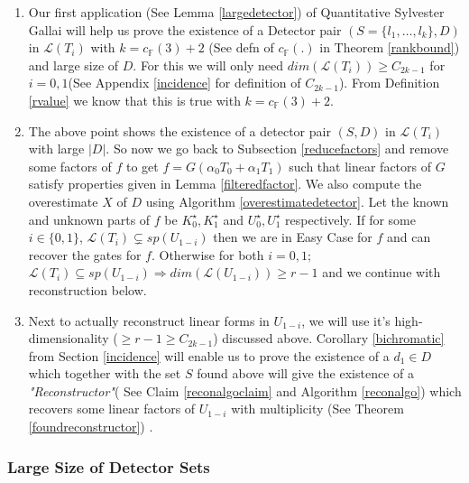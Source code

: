 \documentclass[letterpaper,USenglish,numberwithinsect]{lipics}
\newcommand{\F}{\mathbb{F}}
\newcommand{\ML}{\mathcal{L}}
\begin{document}
\begin{enumerate}

\item Our first application (See Lemma \ref{largedetector}) of Quantitative Sylvester
Gallai will help us prove the existence of
a Detector pair $(S=\{l_{1},\ldots,l_{k}\},D)$ in $\ML(T_i)$ with $k=c_\F(3)+2$ (See defn of $c_\F(.)$ in Theorem \ref{rankbound})
and large size of $D$. For this we will
only need $dim(\ML(T_i))\geq C_{2k-1}$ for $i=0,1$(See Appendix \ref{incidence}
for definition of $C_{2k-1}$). From Definition \ref{rvalue} we know that this is true with $k =c_\F(3) +2$.

\item The above point shows the existence of a detector pair $(S,D)$ in $\ML(T_i)$ with large $|D|$. So now we go back to
Subsection \ref{reducefactors} and remove some factors of $f$ to get $f = G(\alpha_0T_0 + \alpha_1T_1)$
such that linear factors of $G$ satisfy properties given in Lemma \ref{filteredfactor}. We also compute the overestimate
$X$ of $D$ using Algorithm \ref{overestimatedetector}. Let the known and unknown parts of $f$ be $K_0^\star,K_1^\star$
and $U_0^\star, U_1^\star$ respectively. If for some $i\in \{0,1\}$, $\ML(T_i)\subsetneq sp(U_{1-i})$ then we are in
Easy Case for $f$ and can recover the gates for $f$. Otherwise for both $i=0,1;$ $\ML(T_i)\subseteq sp(U_{1-i})
\Rightarrow dim(\ML(U_{1-i}))\geq r-1$ and we continue with reconstruction below.



\item Next to actually reconstruct linear forms in $U_{1-i}$, we will use it's high-dimensionality ($\geq r-1\geq C_{2k-1}$) discussed above.
Corollary \ref{bichromatic} from Section \ref{incidence} will enable us to prove
the existence
of a $d_1\in D$ which together with the set $S$ found above will give the existence of a \emph{"Reconstructor"}( See
Claim \ref{reconalgoclaim} and Algorithm \ref{reconalgo}) which recovers
some linear factors of $U_{1-i}$ with multiplicity (See Theorem \ref{foundreconstructor}) .

\end{enumerate}







\subsubsection{Large Size of Detector Sets}
\end{document}
